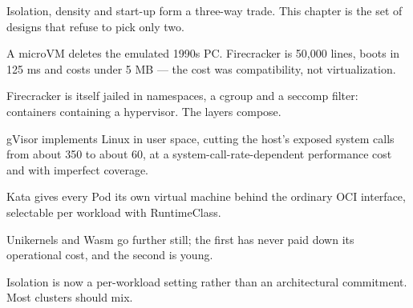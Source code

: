 \begin{chaptersummary}
\begin{tight}
  \item Isolation, density and start-up form a three-way trade. This chapter is
        the set of designs that refuse to pick only two.
  \item A microVM deletes the emulated 1990s PC. Firecracker is 50{,}000 lines,
        boots in 125 ms and costs under 5 MB --- the cost was compatibility,
        not virtualization.
  \item Firecracker is itself jailed in namespaces, a cgroup and a seccomp
        filter: containers containing a hypervisor. The layers compose.
  \item gVisor implements Linux in user space, cutting the host's exposed
        system calls from about 350 to about 60, at a system-call-rate-dependent
        performance cost and with imperfect coverage.
  \item Kata gives every Pod its own virtual machine behind the ordinary OCI
        interface, selectable per workload with RuntimeClass.
  \item Unikernels and Wasm go further still; the first has never paid down its
        operational cost, and the second is young.
  \item Isolation is now a per-workload setting rather than an architectural
        commitment. Most clusters should mix.
\end{tight}
\end{chaptersummary}

